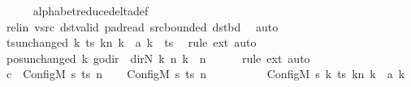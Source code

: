 \begin{isabellebody}
\ \ \ \ \isamarkupfalse%
\ alphabet{\isacharunderscore}{\kern0pt}reduce{\isacharunderscore}{\kern0pt}delta{\isacharunderscore}{\kern0pt}def\isanewline
\ \ \ \ \isamarkupfalse%
\ rel{\isacharunderscore}{\kern0pt}in\ vsrc\ dst{\isacharunderscore}{\kern0pt}valid\ pad{\isacharunderscore}{\kern0pt}read\ src{\isacharunderscore}{\kern0pt}bounded\ dst{\isacharunderscore}{\kern0pt}bd\ \isamarkupfalse%
\ auto\isanewline
\ \ \isamarkupfalse%
\ ts{\isacharunderscore}{\kern0pt}unchanged{\isacharcolon}{\kern0pt}\ {\isachardoublequoteopen}{\isacharparenleft}{\kern0pt}{\isasymlambda}k{\isachardot}{\kern0pt}\ {\isacharparenleft}{\kern0pt}ts\ k{\isacharparenright}{\kern0pt}{\isacharparenleft}{\kern0pt}n\ k\ {\isacharcolon}{\kern0pt}{\isacharequal}{\kern0pt}\ {\isacharquery}{\kern0pt}a\ k{\isacharparenright}{\kern0pt}{\isacharparenright}{\kern0pt}\ {\isacharequal}{\kern0pt}\ ts{\isachardoublequoteclose}\ \isamarkupfalse%
\ {\isacharparenleft}{\kern0pt}rule\ ext{\isacharparenright}{\kern0pt}\ auto\isanewline
\ \ \isamarkupfalse%
\ pos{\isacharunderscore}{\kern0pt}unchanged{\isacharcolon}{\kern0pt}\ {\isachardoublequoteopen}{\isacharparenleft}{\kern0pt}{\isasymlambda}k{\isachardot}{\kern0pt}\ go{\isacharunderscore}{\kern0pt}dir\ {\isacharparenleft}{\kern0pt}{\isacharparenleft}{\kern0pt}{\isasymlambda}{\isacharunderscore}{\kern0pt}{\isachardot}{\kern0pt}\ dir{\isachardot}{\kern0pt}N{\isacharparenright}{\kern0pt}\ k{\isacharparenright}{\kern0pt}\ {\isacharparenleft}{\kern0pt}n\ k{\isacharparenright}{\kern0pt}{\isacharparenright}{\kern0pt}\ {\isacharequal}{\kern0pt}\ n{\isachardoublequoteclose}\isanewline
\ \ \ \ \isamarkupfalse%
\ {\isacharparenleft}{\kern0pt}rule\ ext{\isacharparenright}{\kern0pt}\ auto\isanewline
\ \ \isamarkupfalse%
\ {\isacharquery}{\kern0pt}c{\isacharprime}{\kern0pt}{\isacharprime}{\kern0pt}\ {\isacharequal}{\kern0pt}\ {\isachardoublequoteopen}Config\isactrlsub M\ {\isacharquery}{\kern0pt}s{\isacharprime}{\kern0pt}\ ts\ n{\isachardoublequoteclose}\isanewline
\ \ \isamarkupfalse%
\ {\isachardoublequoteopen}{\isacharparenleft}{\kern0pt}Config\isactrlsub M\ {\isacharquery}{\kern0pt}s\ ts\ n{\isacharcomma}{\kern0pt}\isanewline
\ \ \ \ \ \ \ \ \ \ Config\isactrlsub M\ {\isacharquery}{\kern0pt}s{\isacharprime}{\kern0pt}\ {\isacharparenleft}{\kern0pt}{\isasymlambda}k{\isachardot}{\kern0pt}\ {\isacharparenleft}{\kern0pt}ts\ k{\isacharparenright}{\kern0pt}{\isacharparenleft}{\kern0pt}n\ k\ {\isacharcolon}{\kern0pt}{\isacharequal}{\kern0pt}\ {\isacharquery}{\kern0pt}a\ k{\isacharparenright}{\kern0pt}{\isacharparenright}{\kern0pt}\isanewline

\end{isabellebody}
